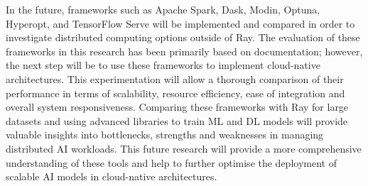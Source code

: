 In the future, frameworks such as Apache Spark, Dask, Modin, Optuna, Hyperopt, and TensorFlow Serve will be implemented and compared in order to investigate distributed computing options outside of Ray. The evaluation of these frameworks in this research has been primarily based on documentation; however, the next step will be to use these frameworks to implement cloud-native architectures. This experimentation will allow a thorough comparison of their performance in terms of scalability, resource efficiency, ease of integration and overall system responsiveness. Comparing these frameworks with Ray for large datasets and using advanced libraries to train ML and DL models will provide valuable insights into bottlenecks, strengths and weaknesses in managing distributed AI workloads. This future research will provide a more comprehensive understanding of these tools and help to further optimise the deployment of scalable AI models in cloud-native architectures.